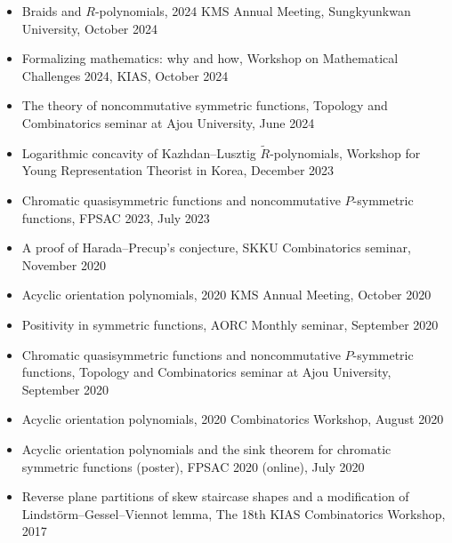 \documentclass[letterpaper,11pt]{article}
\begin{document}
\begin{itemize}
  \item Braids and \( R \)-polynomials, 2024 KMS Annual Meeting, Sungkyunkwan University, October 2024
  
  \item Formalizing mathematics: why and how, Workshop on Mathematical Challenges 2024, KIAS, October 2024
  
  \item The theory of noncommutative symmetric functions, Topology and Combinatorics seminar at Ajou University, June 2024
  
  \item Logarithmic concavity of Kazhdan--Lusztig \( \widetilde{R} \)-polynomials, Workshop for Young Representation Theorist in Korea, December 2023

  \item Chromatic quasisymmetric functions and noncommutative $P$-symmetric functions, FPSAC 2023, July 2023
  
  
  \item A proof of Harada--Precup's conjecture, SKKU Combinatorics seminar, November 2020

  \item Acyclic orientation polynomials, 2020 KMS Annual Meeting, October 2020

  \item Positivity in symmetric functions, AORC Monthly seminar, September 2020
  
  \item Chromatic quasisymmetric functions and noncommutative $P$-symmetric functions, Topology and Combinatorics seminar at Ajou University, September 2020

  \item Acyclic orientation polynomials, 2020 Combinatorics Workshop, August 2020

  \item Acyclic orientation polynomials and the sink theorem for chromatic symmetric functions (poster), FPSAC 2020 (online), July 2020

  \item Reverse plane partitions of skew staircase shapes and a modification of Lindst\"orm--Gessel--Viennot lemma, The 18th KIAS Combinatorics Workshop, 2017
\end{itemize}
\end{document}

